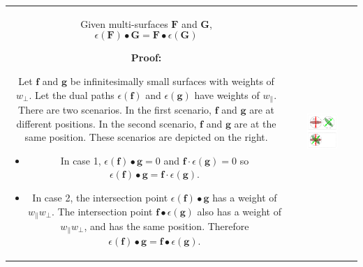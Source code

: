 \begin{tabular}{cc}
\parbox{0.5\textwidth}{
\begin{thm}\label{thm:path-surface_intersection_duality}
Given multi-surfaces \(\mathbf{F}\) and \(\mathbf{G}\), 
\[\epsilon(\mathbf{F}) \bullet \mathbf{G} = \mathbf{F} \bullet \epsilon(\mathbf{G})\]
\end{thm}
\textbf{Proof:}

Let \(\mathbf{f}\) and \(\mathbf{g}\) be infinitesimally small surfaces with weights of \(w_{\perp}\). Let the dual paths \(\epsilon(\mathbf{f})\) and \(\epsilon(\mathbf{g})\) have weights of \(w_{\parallel}\). There are two scenarios. In the first scenario, \(\mathbf{f}\) and \(\mathbf{g}\) are at different positions. In the second scenario, \(\mathbf{f}\) and \(\mathbf{g}\) are at the same position. These scenarios are depicted on the right.

\begin{itemize}
\item In case 1, \(\epsilon(\mathbf{f}) \bullet \mathbf{g} = 0\) and \(\mathbf{f} \cdot \epsilon(\mathbf{g}) = 0\) so \(\epsilon(\mathbf{f}) \bullet \mathbf{g} = \mathbf{f} \cdot \epsilon(\mathbf{g})\). 
\item In case 2, the intersection point \(\epsilon(\mathbf{f}) \bullet \mathbf{g}\) has a weight of \(w_{\parallel} w_{\perp}\). The intersection point \(\mathbf{f} \bullet \epsilon(\mathbf{g})\) also has a weight of \(w_{\parallel} w_{\perp}\), and has the same position. Therefore \(\epsilon(\mathbf{f}) \bullet \mathbf{g} = \mathbf{f} \bullet \epsilon(\mathbf{g})\).  
\end{itemize}
} & \parbox{0.5\textwidth}{
\includegraphics[width = 0.5\textwidth]{Duality/path_surface_duality_intersection}
}
\end{tabular}

